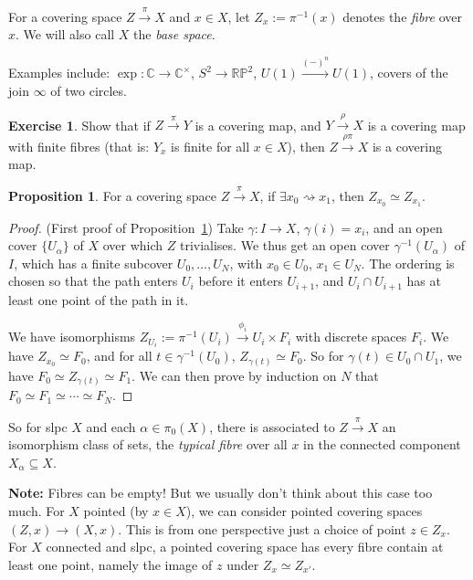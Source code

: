 \documentclass{tufte-handout}
\def\RR{\mathbb{R}}
\def\CC{\mathbb{C}}
\newcommand{\lecturenum}[1]{\marginnote{\color{red}Lecture #1}}
\theoremstyle{definition}
\newtheorem{prop}{Proposition}
\newtheorem{ex}{Exercise}
\begin{document}
For a covering space $Z\xrightarrow{\pi}X$ and $x\in X$, let $Z_x :=\pi^{-1}(x)$ denotes the
\emph{fibre} over $x$.
We will also call $X$ the \emph{base space}.

Examples include: $\exp\colon \CC \to \CC^\times$, $S^2 \to \RR\mathbb{P}^2$, 
$U(1) \xrightarrow{(-)^n} U(1)$, covers of the join $\infty$ of two circles.

\begin{ex}
Show that if $Z\xrightarrow{\pi} Y$ is a covering map, and $Y\xrightarrow{\rho} X$ is a 
covering map with finite fibres (that is: $Y_x$ is finite for all $x\in X$), 
then $Z\xrightarrow{\rho\pi} X$ is a covering map.
\end{ex}


\begin{prop}\label{prop:iso_fibres_of_cov_sp}
For a covering space $Z\xrightarrow{\pi}X$, if $\exists x_0 \rightsquigarrow x_1$, then $Z_{x_0} \simeq Z_{x_1}$.
\end{prop}

\lecturenum{5}

\begin{proof}
(First proof of Proposition~\ref{prop:iso_fibres_of_cov_sp}) Take $\gamma \colon I \to 
X$, $\gamma(i) = x_i$, and an open cover $\{U_\alpha\}$ of $X$ over which $Z$ 
trivialises. We thus get an open cover $\gamma^{-1}(U_\alpha)$ of $I$, which has a 
finite subcover $U_0,\ldots, U_N$, with $x_0 \in U_0$, $x_1 \in U_N$. The ordering is 
chosen so that the path enters $U_i$ before it enters $U_{i+1}$, and $U_i\cap 
U_{i+1}$ has at least one point of the path in it.

We have isomorphisms $Z_{U_i} := \pi^{-1}(U_i) \xrightarrow{\phi_i} U_i \times F_i$ with 
discrete spaces $F_i$. We have $Z_{x_0} \simeq F_0$, and for all $t\in 
\gamma^{-1}(U_0)$, $Z_{\gamma(t)} \simeq F_0$. So for $\gamma(t) \in U_0\cap U_1$, we 
have $F_0 \simeq Z_{\gamma(t)} \simeq F_1$. We can then prove by induction on $N$ that 
$F_0 \simeq F_1 \simeq \cdots \simeq F_N$.
\end{proof}

So for slpc $X$ and each $\alpha \in \pi_0(X)$, there is associated to $Z\xrightarrow{\pi}X$ 
an isomorphism class of sets, the \emph{typical fibre} over all $x$ in the connected component 
$X_\alpha\subseteq X$.

\textbf{Note:} Fibres can be empty! But we usually don't think about this case too much. For 
$X$ pointed (by $x\in X$), we can consider pointed covering spaces $(Z,x) \to (X,x)$.
This is from one perspective just a choice of point $z\in Z_x$. For $X$ connected and slpc, 
a pointed covering space has every fibre contain at least one point, namely the image of $z$ under
$Z_x \simeq Z_{x'}$.
\end{document}
